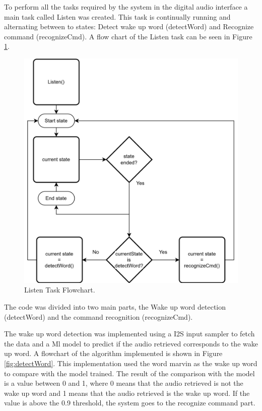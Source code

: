 To perform all the tasks required by the system in the digital audio interface a main task called Listen was created. This task is continually running and alternating between to states: Detect wake up word (detectWord) and Recognize command (recognizeCmd). A flow chart of the Listen task can be seen in Figure \ref{fig:ListenTaskFlowchart}.
\begin{figure}[H]
    \centering
    \includegraphics*[scale = 0.15]{Images/listen.png}
    \caption{Listen Task Flowchart.}
    \label{fig:ListenTaskFlowchart}
\end{figure}

The code was divided into two main parts, the Wake up word detection (detectWord) and the command recognition (recognizeCmd). 


The wake up word detection was implemented using a I2S input sampler to fetch the data and a Ml model to predict if the audio retrieved corresponds to the wake up word. A flowchart of the algorithm implemented is shown in Figure \ref{fig:detectWord}. This implementation used the word marvin as the wake up word to compare with the model trained. The result of the comparison with the model is a value between 0 and 1, where 0 means that the audio retrieved is not the wake up word and 1 means that the audio retrieved is the wake up word. If the value is above the 0.9 threshold, the system goes to the recognize command part.


